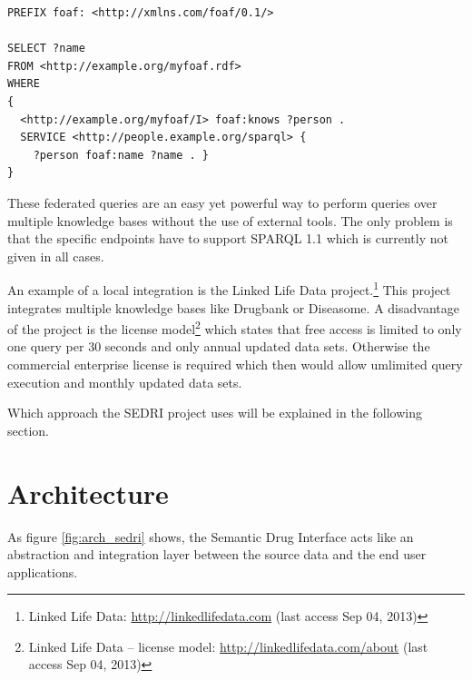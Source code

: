 \lstset{language=sparql}
\begin{lstlisting}[label=lst-fed,numbers=none,caption=Example of SPARQL 1.1 federated query]
PREFIX foaf: <http://xmlns.com/foaf/0.1/>

SELECT ?name
FROM <http://example.org/myfoaf.rdf>
WHERE
{
  <http://example.org/myfoaf/I> foaf:knows ?person .
  SERVICE <http://people.example.org/sparql> { 
    ?person foaf:name ?name . } 
}
\end{lstlisting}

These federated queries are an easy yet powerful way to perform queries over multiple knowledge bases without the use of external tools.
The only problem is that the specific endpoints have to support SPARQL 1.1 which is currently not given in all cases.

An example of a local integration is the Linked Life Data project.\footnote{Linked Life Data: \url{http://linkedlifedata.com} (last access Sep 04, 2013)}
This project integrates multiple knowledge bases like Drugbank or Diseasome.
A disadvantage of the project is the license model\footnote{Linked Life Data -- license model: \url{http://linkedlifedata.com/about} (last access Sep 04, 2013)} which states that free access is limited to only one query per 30 seconds and only annual updated data sets.
Otherwise the commercial enterprise license is required which then would allow umlimited query execution and monthly updated data sets.

Which approach the SEDRI project uses will be explained in the following section.

\section{Architecture}
\label{sec:architecture}

As figure \ref{fig:arch_sedri} shows, the Semantic Drug Interface acts like an abstraction and integration layer between the source data and the end user applications.

